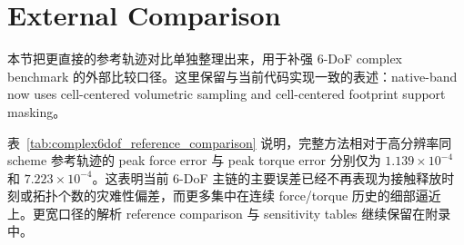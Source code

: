 \section{External Comparison}
本节把更直接的参考轨迹对比单独整理出来，用于补强 6-DoF complex benchmark 的外部比较口径。这里保留与当前代码实现一致的表述：native-band now uses cell-centered volumetric sampling and cell-centered footprint support masking。



表~\ref{tab:complex6dof_reference_comparison} 说明，完整方法相对于高分辨率同 scheme 参考轨迹的 peak force error 与 peak torque error 分别仅为 $1.139\times 10^{-4}$ 和 $7.223\times 10^{-4}$。这表明当前 6-DoF 主链的主要误差已经不再表现为接触释放时刻或拓扑个数的灾难性偏差，而更多集中在连续 force/torque 历史的细部逼近上。更宽口径的解析 reference comparison 与 sensitivity tables 继续保留在附录中。
